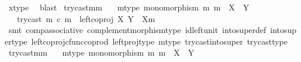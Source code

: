 \begin{isabellebody}
\ x{\isacharunderscore}{\kern0pt}type\ \isamarkupfalse%
\ blast\isanewline
{}\isamarkupfalse%
%
\endisatagproof
{\isafoldproof}%
%
\isadelimproof
\isanewline
%
\endisadelimproof
\isanewline
{}\isamarkupfalse%
\ try{\isacharunderscore}{\kern0pt}cast{\isacharunderscore}{\kern0pt}m{\isacharunderscore}{\kern0pt}m{\isacharcolon}{\kern0pt}\isanewline
\ \ \ m{\isacharunderscore}{\kern0pt}type{\isacharcolon}{\kern0pt}\ {\isachardoublequoteopen}monomorphism\ m{\isachardoublequoteclose}\ {\isachardoublequoteopen}m\ {\isacharcolon}{\kern0pt}\ X\ {\isasymrightarrow}\ Y{\isachardoublequoteclose}\isanewline
\ \ \ {\isachardoublequoteopen}{\isacharparenleft}{\kern0pt}try{\isacharunderscore}{\kern0pt}cast\ m{\isacharparenright}{\kern0pt}\ {\isasymcirc}\isactrlsub c\ m\ {\isacharequal}{\kern0pt}\ left{\isacharunderscore}{\kern0pt}coproj\ X\ {\isacharparenleft}{\kern0pt}Y\ {\isasymsetminus}\ {\isacharparenleft}{\kern0pt}X{\isacharcomma}{\kern0pt}m{\isacharparenright}{\kern0pt}{\isacharparenright}{\kern0pt}{\isachardoublequoteclose}\isanewline
%
\isadelimproof
\ \ %
\endisadelimproof
%
\isatagproof
{}\isamarkupfalse%
\ {\isacharparenleft}{\kern0pt}smt\ comp{\isacharunderscore}{\kern0pt}associative{}\ complement{\isacharunderscore}{\kern0pt}morphism{\isacharunderscore}{\kern0pt}type\ id{\isacharunderscore}{\kern0pt}left{\isacharunderscore}{\kern0pt}unit{}\ into{\isacharunderscore}{\kern0pt}super{\isacharunderscore}{\kern0pt}def\ into{\isacharunderscore}{\kern0pt}super{\isacharunderscore}{\kern0pt}type\ left{\isacharunderscore}{\kern0pt}coproj{\isacharunderscore}{\kern0pt}cfunc{\isacharunderscore}{\kern0pt}coprod\ left{\isacharunderscore}{\kern0pt}proj{\isacharunderscore}{\kern0pt}type\ m{\isacharunderscore}{\kern0pt}type\ try{\isacharunderscore}{\kern0pt}cast{\isacharunderscore}{\kern0pt}into{\isacharunderscore}{\kern0pt}super\ try{\isacharunderscore}{\kern0pt}cast{\isacharunderscore}{\kern0pt}type{\isacharparenright}{\kern0pt}%
\endisatagproof
{\isafoldproof}%
%
\isadelimproof
\isanewline
%
\endisadelimproof
\isanewline
{}\isamarkupfalse%
\ try{\isacharunderscore}{\kern0pt}cast{\isacharunderscore}{\kern0pt}m{\isacharunderscore}{\kern0pt}m{\isacharprime}{\kern0pt}{\isacharcolon}{\kern0pt}\isanewline
\ \ \ m{\isacharunderscore}{\kern0pt}type{\isacharcolon}{\kern0pt}\ {\isachardoublequoteopen}monomorphism\ m{\isachardoublequoteclose}\ {\isachardoublequoteopen}m\ {\isacharcolon}{\kern0pt}\ X\ {\isasymrightarrow}\ Y{\isachardoublequoteclose}\isanewline

\end{isabellebody}
